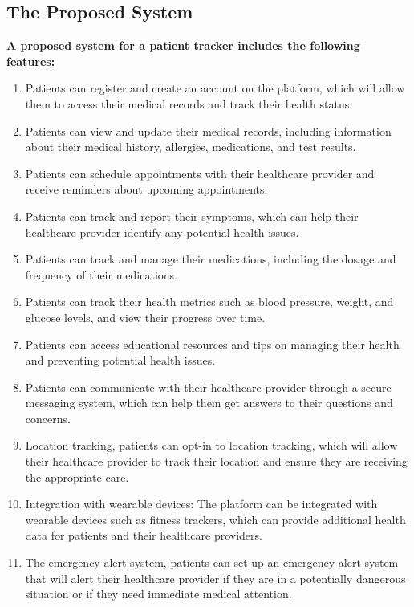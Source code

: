 \documentclass[12pt]{article}
\begin{document}
		\subsection{The Proposed System}
			\textbf{A proposed system for a patient tracker includes the following features:}
			\begin{enumerate}
				\item Patients can register and create an account on the platform, which will allow them to access their medical records and track their health status.
				\item Patients can view and update their medical records, including information about their medical history, allergies, medications, and test results.
				\item Patients can schedule appointments with their healthcare provider and receive reminders about upcoming appointments.
				\item Patients can track and report their symptoms, which can help their healthcare provider identify any potential health issues.
				\item Patients can track and manage their medications, including the dosage and frequency of their medications.
				\item Patients can track their health metrics such as blood pressure, weight, and glucose levels, and view their progress over time.
				\item Patients can access educational resources and tips on managing their health and preventing potential health issues.
				\item Patients can communicate with their healthcare provider through a secure messaging system, which can help them get answers to their questions and concerns.
				\item Location tracking, patients can opt-in to location tracking, which will allow their healthcare provider to track their location and ensure they are receiving the appropriate care.
				\item Integration with wearable devices: The platform can be integrated with wearable devices such as fitness trackers, which can provide additional health data for patients and their healthcare providers.
				\item The emergency alert system, patients can set up an emergency alert system that will alert their healthcare provider if they are in a potentially dangerous situation or if they need immediate medical attention.
			\end{enumerate}
		\begin{center}
			\newpage
		\end{center}
\end{document}
